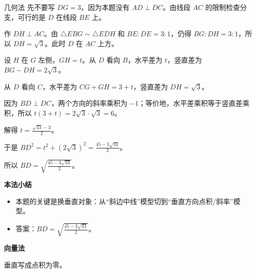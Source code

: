 \documentclass{exam-zh}
\newenvironment{eduSubQuestionItem}[1]{%
  \needspace{4\baselineskip}%
  \vspace{2mm}
  \par\noindent
  \hangindent=8mm\hangafter=1
  {\color{edu-blue}\bfseries #1}\enspace
  \begingroup
  \color{edu-ink}
}{%
  \endgroup
  \par
  \vspace{3mm}
}
\newenvironment{eduBulletList}{%
  \begin{itemize}[
    label=\textbullet,
    leftmargin=5mm,
    itemsep=1.2mm,
    topsep=0pt,
    parsep=0pt
  ]
}{%
  \end{itemize}
}
\begin{document}
\begin{eduSolutionBox}{几何法}
  \begingroup
  \setlength{\parskip}{2.5mm}
先不要写 $DG=3$，因为本题没有 $AD\perp DC$。由线段 $AC$ 的限制检查分支，可行的是 $D$ 在线段 $BE$ 上。\par
作 $DH\perp AC$。由 $\triangle EBG\sim\triangle EDH$ 和 $BE:DE=3:1$，仍得 $BG:DH=3:1$，所以 $DH=\sqrt3$。此时 $D$ 在 $AC$ 上方。\par
设 $H$ 在 $G$ 左侧，$GH=t$。从 $D$ 看向 $B$，水平差为 $t$，竖直差为 $BG-DH=2\sqrt3$。\par
从 $D$ 看向 $C$，水平差为 $CG+GH=3+t$，竖直差为 $DH=\sqrt3$。\par
因为 $BD\perp DC$，两个方向的斜率乘积为 $-1$；等价地，水平差乘积等于竖直差乘积，所以 $t(3+t)=2\sqrt3\cdot\sqrt3=6$。\par
解得 $t=\frac{\sqrt{33}-3}{2}$。\par
于是 $BD^2=t^2+(2\sqrt3)^2=\frac{45-3\sqrt{33}}{2}$。\par
所以 $BD=\sqrt{\frac{45-3\sqrt{33}}{2}}$。\par
  \endgroup
  \vspace{2.5mm}
  {\color{edu-blue}\bfseries\small 本法小结}\par\vspace{1.5mm}
  \begin{eduBulletList}
    \item 本题的关键是换垂直对象：从“斜边中线”模型切到“垂直方向点积/斜率”模型。    \item 答案：$BD=\sqrt{\frac{45-3\sqrt{33}}{2}}$。  \end{eduBulletList}
\end{eduSolutionBox}




\begin{eduSubQuestionItem}{向量法}
垂直写成点积为零。\end{eduSubQuestionItem}
\end{document}
